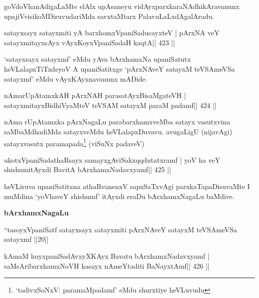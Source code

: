 \begin{artha}
goVdoVhanAdigaLaMte elAlx upAsaneyu vidAyxparxkaraNAdhikAravanunx
upajiVvisikoMDiruvudariMda savxtaMtarx PalavuLaLxdAgalAradu.
\end{artha}




\begin{shl}
satayxsayx satayxmiti yA barxhomxVpaniSaducayxteV |
pArxNA veY satayxmitayxsAyx vAyxKoyxVpaniSadaH kaqtA\hfill || 423 ||
\end{shl}

\begin{artha}
`satayxsayx satayxmf' eMdu yAva bArxhamxNa upaniSatutx   heVLalapxTiTxdeyoV A upaniSatitxge `pArxNAveY satayxM teVSAmeVSa   satayxmf' eMdu vAyxKAyxnavanunx mADide.
\end{artha}

\begin{shl}
nAmarUpAtamxkAH pArxNAH parasatAyxBisaMgateVH |
satayxmitayxBidhiVyaMteV teVSAM satayxM paraM padamf\hfill || 424 ||
\end{shl}

\begin{artha}
nAma rUpAtamxka pArxNagaLu parabarxhamxveMba satayx vasutxvina
saMbaMdhadiMda satayxveMdu heVLalapxDuvavu. avugaLigU (nijavAgi)
satayxvasutx paramapada\footnote[1]{`tadivxSoNxV: paramaMpadamf' 
eMdu shurxtiye heVLuvudu} (viSuNx padaveV) 
\end{artha}

\begin{shl}
ukotxVpaniSadathaRsayx samayxgAviSakxqqdutatxramf |
yoV ha veY shishumitAyxdi BavitA bArxhamxNadavxyamf\hfill || 425 ||
\end{shl}

\begin{artha}
heVLiruva upaniSatitxna athaRvanenxV sapxSaTxvAgi parxkaTapaDisuvaMte
I muMdina `yoVhaveY shishumf' itAyxdi eraDu bArxhamxNagaLu baMdive.
\end{artha}


\medskip
\centerline{\textbf{bArxhamxNagaLu}}

``tasoyxVpaniSatf satayxsayx satayxmiti pArxNAveY satayxM teVSAmeVSa
satayxmf ||20||


\medskip



\begin{shl}
kAmaM huyxpaniSadAvxyXKAyx Bavatu bArxhamxNadavxyamf |
saMsAribarxhamxNoVH kasayx nAmeYtaditi BaNayxtAmf\hfill || 426 ||
\end{shl}

